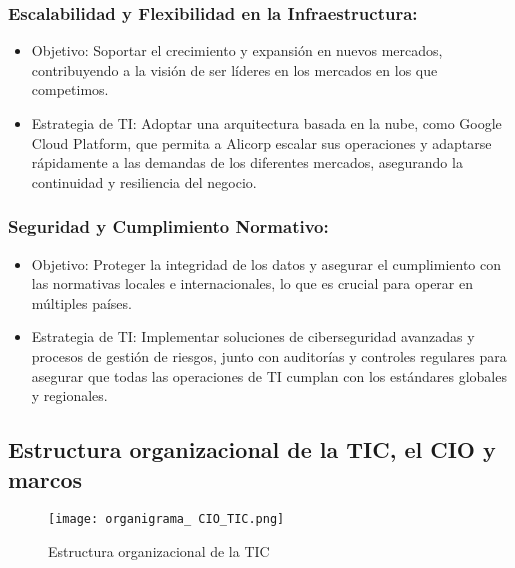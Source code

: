     \subsubsection*{Escalabilidad y Flexibilidad en la Infraestructura:}
        \begin{itemize}
            \item Objetivo: Soportar el crecimiento y expansión en nuevos mercados, contribuyendo a la visión de ser líderes en los mercados en los que competimos.
            \item Estrategia de TI: Adoptar una arquitectura basada en la nube, como Google Cloud Platform, que permita a Alicorp escalar sus operaciones y adaptarse rápidamente a las demandas de los diferentes mercados, asegurando la continuidad y resiliencia del negocio.
        \end{itemize}

    \subsubsection*{Seguridad y Cumplimiento Normativo:}
        \begin{itemize}
            \item Objetivo: Proteger la integridad de los datos y asegurar el cumplimiento con las normativas locales e internacionales, lo que es crucial para operar en múltiples países.
            \item Estrategia de TI: Implementar soluciones de ciberseguridad avanzadas y procesos de gestión de riesgos, junto con auditorías y controles regulares para asegurar que todas las operaciones de TI cumplan con los estándares globales y regionales.
        \end{itemize}



\subsection{Estructura organizacional de la TIC, el CIO y marcos}
    \begin{figure}[!ht]
        \centering
        \texttt{[image: organigrama\_ CIO\_TIC.png]}
        \caption{Estructura organizacional de la TIC}
    \end{figure}




